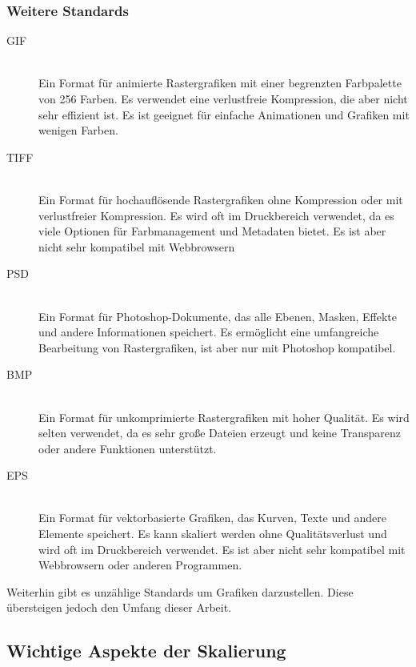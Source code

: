 \subsubsection{Weitere Standards}
\begin{description}
\item[\ac{GIF}]~\\
Ein Format für animierte Rastergrafiken mit einer begrenzten Farbpalette von 256 Farben. Es verwendet eine verlustfreie Kompression, die aber nicht sehr effizient ist. Es ist geeignet für einfache Animationen und Grafiken mit wenigen Farben.
\item[\ac{TIFF}] \\ 
Ein Format für hochauflösende Rastergrafiken ohne Kompression oder mit verlustfreier Kompression. Es wird oft im Druckbereich verwendet, da es viele Optionen für Farbmanagement und Metadaten bietet. Es ist aber nicht sehr kompatibel mit Webbrowsern \\
\item[\ac{PSD}] \\
Ein Format für Photoshop-Dokumente, das alle Ebenen, Masken, Effekte und andere Informationen speichert. Es ermöglicht eine umfangreiche Bearbeitung von Rastergrafiken, ist aber nur mit Photoshop kompatibel.\\
\item[\ac{BMP}] \\
Ein Format für unkomprimierte Rastergrafiken mit hoher Qualität. Es wird selten verwendet, da es sehr große Dateien erzeugt und keine Transparenz oder andere Funktionen unterstützt. \\
\item[\ac{EPS}] \\
Ein Format für vektorbasierte Grafiken, das Kurven, Texte und andere Elemente speichert. Es kann skaliert werden ohne Qualitätsverlust und wird oft im Druckbereich verwendet. Es ist aber nicht sehr kompatibel mit Webbrowsern oder anderen Programmen. \\
\end{description}
Weiterhin gibt es unzählige Standards um Grafiken darzustellen. Diese übersteigen jedoch den Umfang dieser Arbeit.
\subsection{Wichtige Aspekte der Skalierung}
